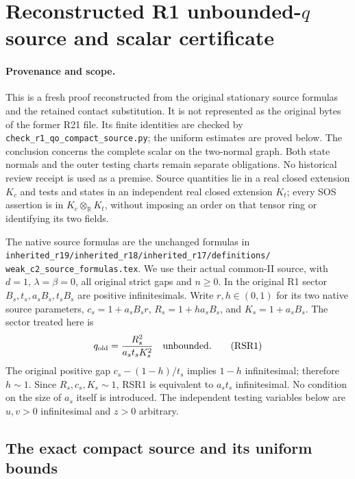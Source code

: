 \section{Reconstructed R1 unbounded-$q$ source and scalar certificate}
\label{sec:reconstructed-r1-qo-source-scalar}

\paragraph{Provenance and scope.}
This is a fresh proof reconstructed from the original stationary source
formulas and the retained contact substitution. It is not represented as
the original bytes of the former R21 file. Its finite identities are
checked by \texttt{check\_r1\_qo\_compact\_source.py}; the uniform estimates
are proved below. The conclusion concerns the complete scalar on the
two-normal graph. Both state normals and the outer testing charts remain
separate obligations. No historical review receipt is used as a premise.
Source quantities lie in a real closed extension $K_c$ and tests and
states in an independent real closed extension $K_t$; every SOS assertion
is in $K_c\otimes_{\mathbb R}K_t$, without imposing an order on that
tensor ring or identifying its two fields.

The native source formulas are the unchanged formulas in
\texttt{inherited\_r19/inherited\_r18/inherited\_r17/definitions/}
\texttt{weak\_c2\_source\_formulas.tex}. We use their actual common-II
source, with $d=1$, $\lambda=\beta=0$, all original strict gaps and
$n\geq0$. In the original R1 sector $B_s,t_s,a_sB_s,t_sB_s$ are
positive infinitesimals. Write $r,h\in(0,1)$ for its two native source
parameters, $c_s=1+a_sB_sr$, $R_s=1+ha_sB_s$, and $K_s=1+a_sB_s$.
The sector treated here is
\[
 q_{\rm old}=\frac{R_s^2}{a_st_sK_s^2}\quad\hbox{unbounded}.
 \tag{RSR1}
\]
The original positive gap $c_s-(1-h)/t_s$ implies $1-h$ infinitesimal;
therefore $h\sim1$. Since $R_s,c_s,K_s\sim1$, RSR1 is equivalent to
$a_st_s$ infinitesimal. No condition on the size of $a_s$ itself is
introduced. The independent testing variables below are $u,v>0$
infinitesimal and $z>0$ arbitrary.

\subsection{The exact compact source and its uniform bounds}

